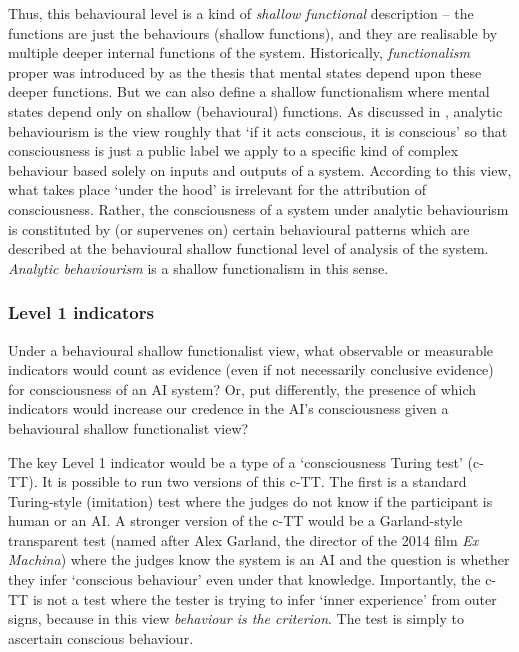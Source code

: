 \documentclass[11pt, a4paper, onecolumn, gdm]{google}
\begin{document}
Thus, this behavioural level is a kind of \emph{shallow functional} description -- the functions are just the behaviours (shallow functions), and they are realisable by multiple deeper internal functions of the system.
Historically, \emph{functionalism} proper was introduced by \citet{putnam1967} as the thesis that mental states depend upon these deeper functions.
But we can also define a shallow functionalism where mental states depend only on shallow (behavioural) functions.
As discussed in , analytic behaviourism is the view roughly that `if it acts conscious, it is conscious' so that consciousness is just a public label we apply to a specific kind of complex behaviour based solely on inputs and outputs of a system.
According to this view, what takes place `under the hood' is irrelevant for the attribution of consciousness.
Rather, the consciousness of a system under analytic behaviourism is constituted by (or supervenes on) certain behavioural patterns which are described at the behavioural shallow functional level of analysis of the system.
\emph{Analytic behaviourism} is a shallow functionalism in this sense.

\subsubsection*{Level 1 indicators}\label{level-1-indicators}

Under a behavioural shallow functionalist view, what observable or measurable indicators would count as evidence (even if not necessarily conclusive evidence) for consciousness of an AI system?
Or, put differently, the presence of which indicators would increase our credence in the AI's consciousness given a behavioural shallow functionalist view?

The key Level 1 indicator would be a type of a `consciousness Turing test' (c-TT).
It is possible to run two versions of this c-TT.
The first is a standard Turing-style (imitation) test where the judges do not know if the participant is human or an AI.
A stronger version of the c-TT would be a Garland-style transparent test (named after Alex Garland, the director of the 2014 film \emph{Ex Machina}) where the judges know the system is an AI and the question is whether they infer `conscious behaviour' even under that knowledge.
Importantly, the c-TT is not a test where the tester is trying to infer `inner experience' from outer signs, because in this view \emph{behaviour is the criterion}.
The test is simply to ascertain conscious behaviour.
\end{document}
